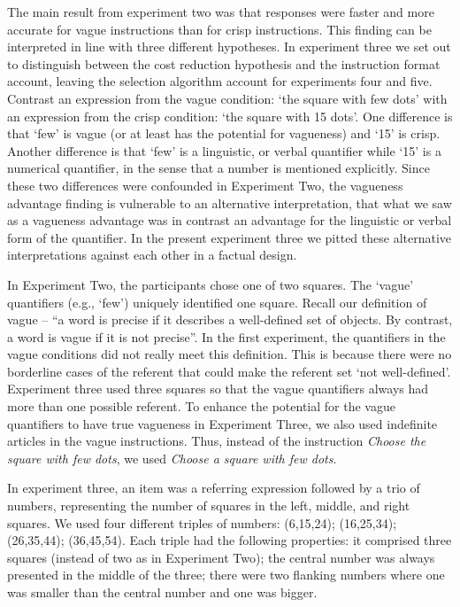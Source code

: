 \documentclass[doc,apacite]{apa6}
\begin{document}
The main result from experiment two was that responses were faster and more accurate for vague instructions than for crisp instructions. This finding can be interpreted in line with three different hypotheses.%
In experiment three we set out to distinguish between the cost reduction hypothesis and the instruction format account, leaving the selection algorithm account for experiments four and five. Contrast an expression from the vague condition: `the square with few dots' with an expression from the crisp condition: `the square with 15 dots'. One difference is that `few' is vague (or at least has the potential for vagueness) and `15' is crisp. Another difference is that `few' is a linguistic, or verbal quantifier while `15' is a numerical quantifier, in the sense that a number is mentioned explicitly. Since these two differences were confounded in Experiment Two, the vagueness advantage finding is vulnerable to an alternative interpretation, that what we saw as a vagueness advantage was in contrast an advantage for the linguistic or verbal form of the quantifier. In the present experiment three we pitted these alternative interpretations against each other in a factual design. 

In Experiment Two, the participants chose one of two squares. The `vague' quantifiers (e.g., `few') uniquely identified one square. Recall our definition of vague  -- ``a word is precise if it describes a well-defined set of objects. By contrast, a word is vague if it is not precise''.  In the first experiment, the quantifiers in the vague conditions did not really meet this definition. This is because there were no borderline cases of the referent that could make the referent set `not well-defined'. Experiment three used three squares so that the vague quantifiers always had more than one possible referent. To enhance the potential for the vague quantifiers to have true vagueness in Experiment Three, we also used indefinite articles in the vague instructions. Thus, instead of the instruction \emph{Choose the square with few dots}, we used \emph{Choose a square with few dots}.

In experiment three, an item was a referring expression followed by a trio of numbers, representing the number of squares in the left, middle, and right squares. We used four different triples of numbers: (6,15,24); (16,25,34); (26,35,44); (36,45,54). Each triple had the following properties: it comprised three squares (instead of two as in Experiment Two); the central number was always presented in the middle of the three; there were two flanking numbers where one was smaller than the central number and one was bigger. 
\end{document}
